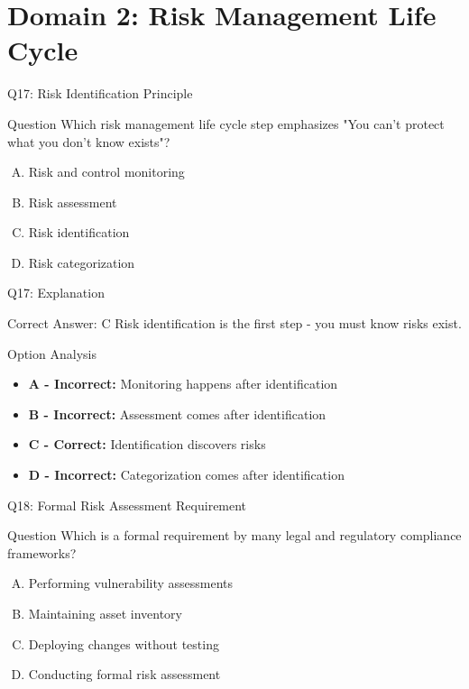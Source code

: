 \documentclass{beamer}
\begin{document}
	
	
	
	\section{Domain 2: Risk Management Life Cycle}

	\begin{frame}{Q17: Risk Identification Principle}
		\begin{block}{Question}
			Which risk management life cycle step emphasizes "You can't protect what you don't know exists"?
		\end{block}
		\begin{enumerate}[(A)]
			\item Risk and control monitoring
			\item Risk assessment
			\item Risk identification
			\item Risk categorization
		\end{enumerate}
	\end{frame}
	
	\begin{frame}{Q17: Explanation}
		\begin{block}{Correct Answer: C}
			Risk identification is the first step - you must know risks exist.
		\end{block}
		\begin{block}{Option Analysis}
			\begin{itemize}
				\item \textbf{A - Incorrect:} Monitoring happens after identification
				\item \textbf{B - Incorrect:} Assessment comes after identification
				\item \textbf{C - Correct:} Identification discovers risks
				\item \textbf{D - Incorrect:} Categorization comes after identification
			\end{itemize}
		\end{block}
	\end{frame}
	
	\begin{frame}{Q18: Formal Risk Assessment Requirement}
		\begin{block}{Question}
			Which is a formal requirement by many legal and regulatory compliance frameworks?
		\end{block}
		\begin{enumerate}[(A)]
			\item Performing vulnerability assessments
			\item Maintaining asset inventory
			\item Deploying changes without testing
			\item Conducting formal risk assessment
		\end{enumerate}
	\end{frame}
	
\end{document}
